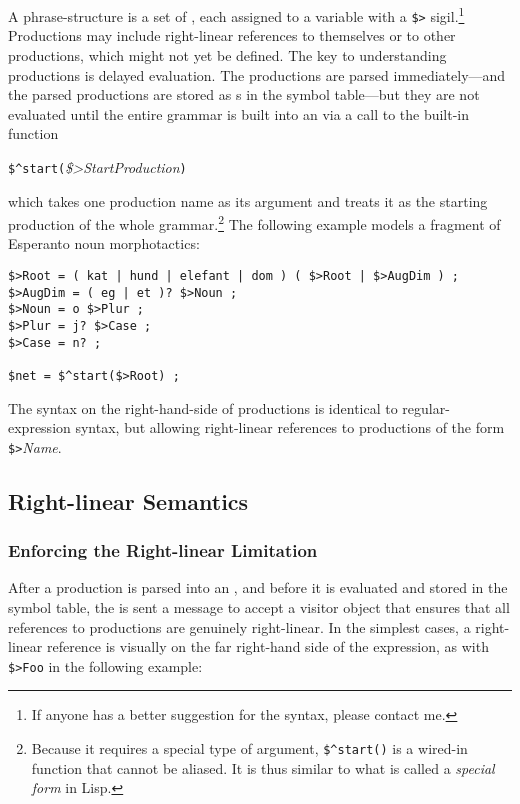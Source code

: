 
A \Kleene{} phrase-structure  is a set of
, each
assigned to a variable with a \verb!$>! sigil.\footnote{If anyone has a better
suggestion for the syntax, please contact me.}  Productions may
include right-linear references to themselves or to other
productions, which might not yet be defined.  The key to understanding
productions is delayed evaluation.  The productions are parsed
immediately---and the parsed productions are stored as s in the
symbol table---but they are not evaluated until the entire grammar is built
into an \fsm{} via a call to the built-in function

\vspace{0.5cm}
\verb!$^start(!\emph{\$>StartProduction}\verb!)!
\vspace{0.5cm}

\noindent
which takes one production
name as its argument and treats it as the starting production of the whole
grammar.\footnote{Because it requires a special type of argument, \verb!$^start()!
is a wired-in function that cannot be aliased.  It is thus similar to what is called
a \emph{special form} in Lisp.}
The following example models a fragment of Esperanto noun morphotactics:

\begin{Verbatim}
$>Root = ( kat | hund | elefant | dom ) ( $>Root | $>AugDim ) ;
$>AugDim = ( eg | et )? $>Noun ;
$>Noun = o $>Plur ;
$>Plur = j? $>Case ;
$>Case = n? ;

$net = $^start($>Root) ;
\end{Verbatim}

\noindent
The syntax on the right-hand-side of productions is identical to regular-expression syntax, but allowing right-linear references to productions of the form
\verb!$>!\emph{Name}.  

\subsection{Right-linear Semantics}

\subsubsection{Enforcing the Right-linear Limitation}

After a production is parsed into an
, and before it is evaluated and stored in the symbol table, the
 is sent a message to accept a visitor object
that ensures that
all references to productions are genuinely right-linear.  In the simplest cases,
a right-linear reference is visually on the far right-hand side of the
expression, as with \verb!$>Foo! in the following example:

